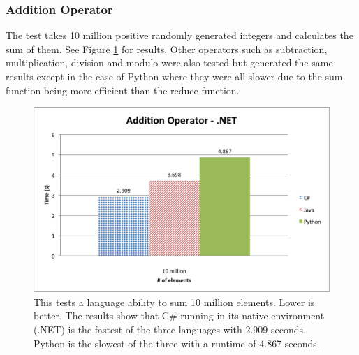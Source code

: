 \subsubsection{Addition Operator}

The test takes 10 million positive randomly generated integers and calculates the sum of them. See Figure \ref{fig:net_addition} for results. Other operators such as subtraction, multiplication, division and modulo were also tested but generated the same results except in the case of Python where they were all slower due to the sum function being more efficient than the reduce function.

\begin{figure}[h]
	\centering
	\includegraphics[width=1.0\linewidth]{chapters/new_media/AdditionOperatorNet.png}
	\caption{This tests a language ability to sum 10 million elements. Lower is better. The results show that C\# running in its native environment (.NET) is the fastest of the three languages with 2.909 seconds. Python is the slowest of the three with a runtime of 4.867 seconds.}
	\label{fig:net_addition}
\end{figure}
